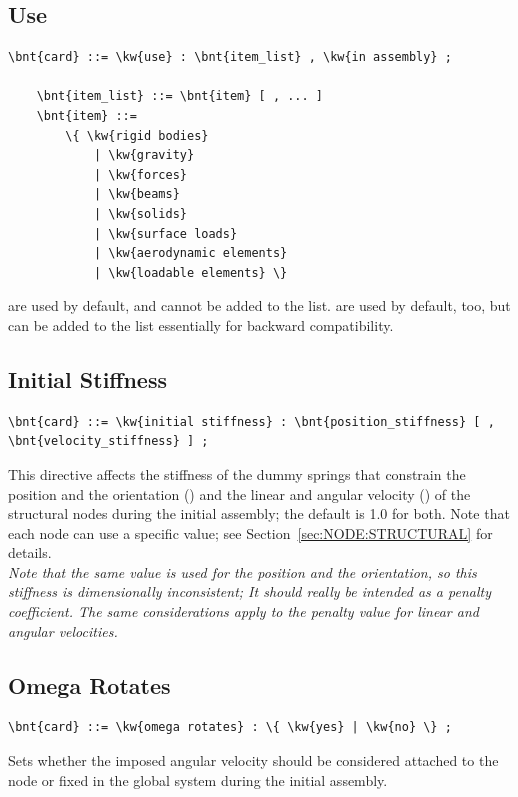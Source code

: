 \subsection{Use}\label{sec:CONTROLDATA:USE}
\begin{Verbatim}[commandchars=\\\{\}]
    \bnt{card} ::= \kw{use} : \bnt{item_list} , \kw{in assembly} ;

    \bnt{item_list} ::= \bnt{item} [ , ... ]
    \bnt{item} ::=
        \{ \kw{rigid bodies}
            | \kw{gravity}
            | \kw{forces}
            | \kw{beams}
            | \kw{solids}
            | \kw{surface loads}
            | \kw{aerodynamic elements}
            | \kw{loadable elements} \} 
\end{Verbatim}
 are used by default, and cannot be added to the list.
 are used by default, too, but can be added to the list
essentially for backward compatibility.

\subsection{Initial Stiffness}\label{sec:CONTROLDATA:INITIALSTIFFNESS}
\begin{Verbatim}[commandchars=\\\{\}]
    \bnt{card} ::= \kw{initial stiffness} : \bnt{position_stiffness} [ , \bnt{velocity_stiffness} ] ;
\end{Verbatim}
This directive affects the stiffness of the dummy springs that constrain
the position and the orientation ()
and the linear and angular velocity ()
of the structural nodes during the initial assembly; the default is 1.0 for both.
Note that each node can use a specific value; 
see Section~\ref{sec:NODE:STRUCTURAL} for details. \\
\emph{Note that the same value is used for the position and the orientation,
so this stiffness is dimensionally inconsistent; It should really 
be intended as a penalty coefficient.
The same considerations apply to the penalty value for linear 
and angular velocities.}

\subsection{Omega Rotates}
\begin{Verbatim}[commandchars=\\\{\}]
    \bnt{card} ::= \kw{omega rotates} : \{ \kw{yes} | \kw{no} \} ;
\end{Verbatim}
Sets whether the imposed angular velocity should be considered attached 
to the node or fixed in the global system during the initial assembly.

